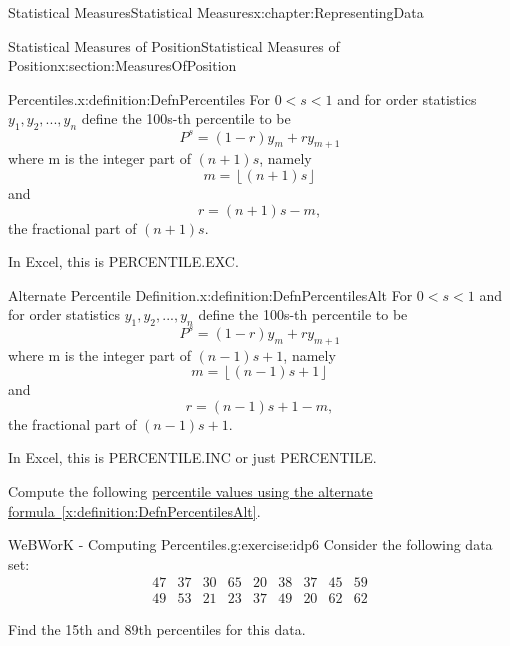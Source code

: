 \documentclass[oneside,10pt,]{book}
\newcommand{\xreffont}{\relax}
\numberwithin{equation}{section}
\newcommand{\lt}{<}
\newcommand{\amp}{&}
\begin{document}
\begin{chapterptx}{Statistical Measures}{}{Statistical Measures}{}{}{x:chapter:RepresentingData}
\begin{sectionptx}{Statistical Measures of Position}{}{Statistical Measures of Position}{}{}{x:section:MeasuresOfPosition}
\begin{definition}{Percentiles.}{x:definition:DefnPercentiles}%
For \(0 \lt s \lt 1\) and for order statistics \(y_1, y_2, ..., y_n\) define the 100s-th percentile to be%
\begin{equation*}
P^{s} = (1-r)y_m + ry_{m+1}
\end{equation*}
where m is the integer part of \((n+1)s\), namely%
\begin{equation*}
m = \left\lfloor (n+1)s \right\rfloor
\end{equation*}
and%
\begin{equation*}
r = (n+1)s - m,
\end{equation*}
the fractional part of \((n+1)s\).%
\par
In Excel, this is PERCENTILE.EXC.%
\end{definition}
\begin{definition}{Alternate Percentile Definition.}{x:definition:DefnPercentilesAlt}%
For \(0 \lt s \lt 1\) and for order statistics \(y_1, y_2, ..., y_n\) define the 100s-th percentile to be%
\begin{equation*}
P^{s} = (1-r)y_m + ry_{m+1}
\end{equation*}
where m is the integer part of \((n-1)s + 1\), namely%
\begin{equation*}
m = \left\lfloor (n-1)s + 1 \right\rfloor 
\end{equation*}
and%
\begin{equation*}
r = (n-1)s + 1 - m,
\end{equation*}
the fractional part of \((n-1)s+1\).%
\par
In Excel, this is PERCENTILE.INC or just PERCENTILE.%
\end{definition}
Compute the following \hyperref[x:definition:DefnPercentilesAlt]{percentile values using the alternate formula~{\xreffont\ref{x:definition:DefnPercentilesAlt}}}.%
\begin{inlineexercise}{WeBWorK - Computing Percentiles.}{g:exercise:idp6}%
Consider the following data set:%
\begin{equation*}
\begin{array}{ccccccccc} 
47 \amp  37 \amp  30 \amp  65 \amp  20 \amp  38 \amp  37 \amp  45 \amp  59\\
49 \amp  53 \amp  21 \amp  23 \amp  37 \amp  49 \amp  20 \amp  62 \amp  62  
\end{array}
\end{equation*}
%
\par
Find the 15th and 89th percentiles for this data.%

\end{inlineexercise}
\end{sectionptx}
\end{chapterptx}
\end{document}
